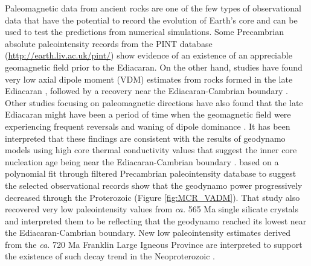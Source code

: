 \documentclass[draft]{agujournal2019}
\begin{document}
Paleomagnetic data from ancient rocks are one of the few types of observational data that have the potential to record the evolution of Earth’s core and can be used to test the predictions from numerical simulations. Some Precambrian absolute paleointensity records from the PINT database (\url{http://earth.liv.ac.uk/pint/}) show evidence of an existence of an appreciable geomagnetic field prior to the Ediacaran. On the other hand, studies have found very low axial dipole moment (VDM) estimates from rocks formed in the late Ediacaran \cite{Bono2019a, Shcherbakova2019a, Thallner2021b}, followed by a recovery near the Ediacaran-Cambrian boundary \cite{Thallner2021a}. Other studies focusing on paleomagnetic directions have also found that the late Ediacaran might have been a period of time when the geomagnetic field were experiencing frequent reversals and waning of dipole dominance \cite{Bono2015a, Kodama2020a}. It has been interpreted that these findings are consistent with the results of geodynamo models using high core thermal conductivity values that suggest the inner core nucleation age being near the Ediacaran-Cambrian boundary \cite{Driscoll2016a, Davies2021a}.  based on a polynomial fit through filtered Precambrian paleointensity database to suggest the selected observational records show that the geodynamo power progressively decreased through the Proterozoic (Figure \ref{fig:MCR_VADM}). That study also recovered very low paleointensity values from \textit{ca.} 565 Ma single silicate crystals and interpreted them to be reflecting that the geodynamo reached its lowest near the Ediacaran-Cambrian boundary. New low paleointensity estimates derived from the \textit{ca.} 720 Ma Franklin Large Igneous Province are interpreted to support the existence of such decay trend in the Neoproterozoic \cite{Lloyd2021a}. 
\end{document}
